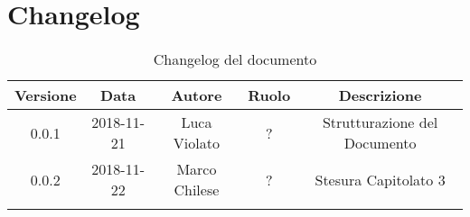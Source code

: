\section{Changelog}

\begin{center}
\begin{longtable}{|c|c|c|c|c|}
\hline
\textbf{Versione} & \textbf{Data} & \textbf{Autore} & \textbf{Ruolo} & \textbf{Descrizione} \\
\hline \hline
\endfirsthead
0.0.1 & 2018-11-21 & Luca Violato & ? & Strutturazione del Documento \\
0.0.2 & 2018-11-22 & Marco Chilese & ? & Stesura Capitolato 3 \\
\hline
\caption{Changelog del documento}
\end{longtable}
\end{center}
